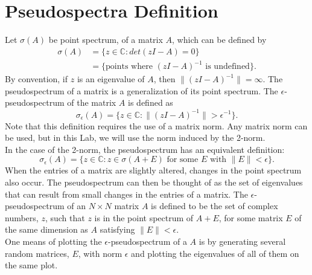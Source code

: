 \label{lab:pseudospectra}



\section*{Pseudospectra Definition}

Let $\sigma(A)$ be point spectrum, of a matrix $A$, which can be defined by
\begin{align}
	\sigma(A)&=\{z \in \mathbb{C}: det(zI-A)=0\}\\
	&=\{\text{points where }(zI-A)^{-1} \text{ is undefined}\}.
\end{align}
By convention, if $z$ is an eigenvalue of $A$, then $\|(zI-A)^{-1}\|=\infty$.
The pseudospectrum of a matrix is a generalization of its point spectrum. The $\epsilon$-pseudospectrum of the matrix $A$ is defined as
\begin{equation}
	\sigma_{\epsilon}(A)=\{z \in \mathbb{C}:\|(zI-A)^{-1}\| > \epsilon^{-1}\}.
\end{equation}
Note that this definition requires the use of a matrix norm. Any matrix norm can be used, but in this Lab, we will use the norm induced by the 2-norm.\\

In the case of the 2-norm, the pseudospectrum has an equivalent definition:
\begin{equation}
	\sigma_{\epsilon}(A)=\{z \in \mathbb{C}: z \in \sigma(A+E) \text{ for some $E$ with } \|E\|<\epsilon\}.
\end{equation}
When the entries of a matrix are slightly altered, changes in the point spectrum also occur. The pseudospectrum can then be thought of as the set of eigenvalues that can result from small changes in the entries of a matrix. The $\epsilon$-pseudospectrum of an $N\times N$ matrix $A$ is defined to be the set of complex numbers, $z$, such that $z$ is in the point spectrum of $A+E$, for some matrix $E$ of the same dimension as $A$ satisfying $\lVert E \rVert < \epsilon$.\\


One means of plotting the $\epsilon$-pseudospectrum of a $A$ is by generating several random matrices, $E$, with norm $\epsilon$ and plotting the eigenvalues of all of them on the same plot.\\


